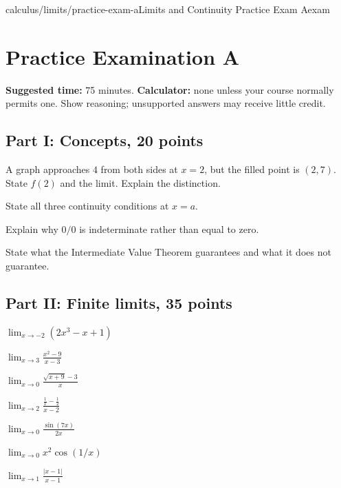 \begin{webpage}{calculus/limits/practice-exam-a}{Limits and Continuity Practice Exam A}{exam}
\section{Practice Examination A}

\textbf{Suggested time:} 75 minutes. \textbf{Calculator:} none unless your course normally permits one. Show reasoning; unsupported answers may receive little credit.

\subsection*{Part I: Concepts, 20 points}
\begin{bgexercises}[label=\textbf{A\arabic*.}]
  \item A graph approaches \(4\) from both sides at \(x=2\), but the filled point is \((2,7)\). State \(f(2)\) and the limit. Explain the distinction.
  \item State all three continuity conditions at \(x=a\).
  \item Explain why \(0/0\) is indeterminate rather than equal to zero.
  \item State what the Intermediate Value Theorem guarantees and what it does not guarantee.
\end{bgexercises}

\subsection*{Part II: Finite limits, 35 points}
\begin{bgexercises}[label=\textbf{A\arabic*.},resume]
  \item \(\displaystyle\lim_{x\to-2}(2x^3-x+1)\)
  \item \(\displaystyle\lim_{x\to3}\frac{x^2-9}{x-3}\)
  \item \(\displaystyle\lim_{x\to0}\frac{\sqrt{x+9}-3}{x}\)
  \item \(\displaystyle\lim_{x\to2}\frac{\frac1x-\frac12}{x-2}\)
  \item \(\displaystyle\lim_{x\to0}\frac{\sin(7x)}{2x}\)
  \item \(\displaystyle\lim_{x\to0}x^2\cos(1/x)\)
  \item \(\displaystyle\lim_{x\to1}\frac{|x-1|}{x-1}\)
\end{bgexercises}


\end{webpage}
